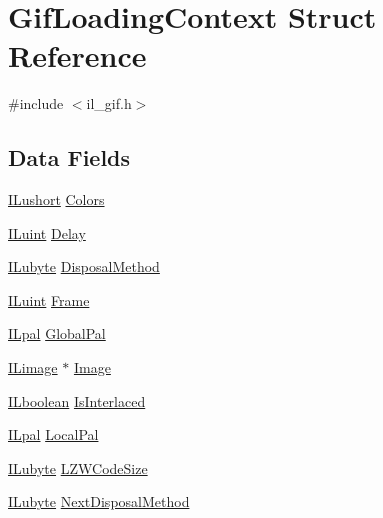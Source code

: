 \hypertarget{struct_gif_loading_context}{\section{Gif\-Loading\-Context Struct Reference}
\label{struct_gif_loading_context}
}


{\ttfamily \#include $<$il\-\_\-gif.\-h$>$}

\subsection*{Data Fields}
\begin{DoxyCompactItemize}
\item 
\hyperlink{il_8h_af6287b43748354a7c4864da43ae56962}{I\-Lushort} \hyperlink{struct_gif_loading_context_a42861cfbacb36805c706b0c5f90dd710}{Colors}
\item 
\hyperlink{il_8h_ac6508d0e9c19e32f32e00d54b5b8cf30}{I\-Luint} \hyperlink{struct_gif_loading_context_ad3d49c46dfc8d1e406cc1fc13b39858a}{Delay}
\item 
\hyperlink{il_8h_a8d2f04500100a86d1b00e98ab1b15a33}{I\-Lubyte} \hyperlink{struct_gif_loading_context_aff6285bed3522dbbf2f70c1e2c517648}{Disposal\-Method}
\item 
\hyperlink{il_8h_ac6508d0e9c19e32f32e00d54b5b8cf30}{I\-Luint} \hyperlink{struct_gif_loading_context_af038293e3767d9ee160cc516e8327952}{Frame}
\item 
\hyperlink{struct_i_lpal}{I\-Lpal} \hyperlink{struct_gif_loading_context_a2e934790b78d60a5ca246014a34c546d}{Global\-Pal}
\item 
\hyperlink{struct_i_limage}{I\-Limage} $\ast$ \hyperlink{struct_gif_loading_context_a3886f625b62940075991f33d913127d0}{Image}
\item 
\hyperlink{il_8h_a8be80d75c2c636b9f2250fe10c2e7874}{I\-Lboolean} \hyperlink{struct_gif_loading_context_a75eabfe96a066253ae5662badf0efa58}{Is\-Interlaced}
\item 
\hyperlink{struct_i_lpal}{I\-Lpal} \hyperlink{struct_gif_loading_context_a5d02e7068145fa2b6118bf32c26d88e5}{Local\-Pal}
\item 
\hyperlink{il_8h_a8d2f04500100a86d1b00e98ab1b15a33}{I\-Lubyte} \hyperlink{struct_gif_loading_context_ab4a91e54172dd34cc398c150ee11ff35}{L\-Z\-W\-Code\-Size}
\item 
\hyperlink{il_8h_a8d2f04500100a86d1b00e98ab1b15a33}{I\-Lubyte} \hyperlink{struct_gif_loading_context_aa0318b1a58d07f1b5f2b2ece5b890b3d}{Next\-Disposal\-Method}

\end{DoxyCompactItemize}
